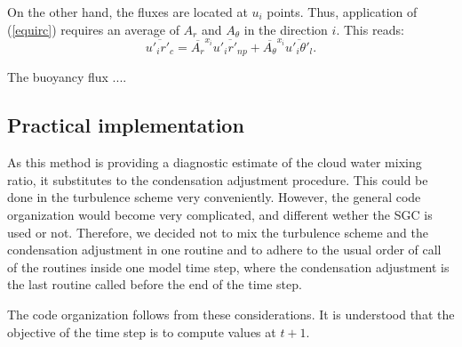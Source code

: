 On the other hand, the fluxes are located at $u_i$ points. Thus,
application of (\ref{equirc}) requires an average of
$A_{r}$ and $A_{\theta}$ in the direction $i$.
This reads:
\begin{equation}
\overline{{u'_{i}}{r'_{c}}} = {\overline{A_{r}}}^{x_{i}} \overline{{u'_{i}}{r'_{np}}} +
{\overline{A_{\theta}}}^{x_{i}} \overline{{u'_{i}}{{\theta}'_{l}}}.
\end{equation}

The buoyancy flux ....


\subsection{Practical implementation}


As this method is providing a diagnostic estimate of
the cloud water mixing ratio,
it substitutes to the condensation adjustment procedure.  This could be done in
the turbulence scheme very conveniently.  However, the general code organization
would become very complicated, and different wether the SGC is used or not.
Therefore, we decided not to mix the turbulence scheme and the condensation
adjustment in one routine and to adhere to the usual order
of call of the routines inside one model time step,
where the condensation adjustment
is the last routine called before the end of the time step.

The code organization follows from these considerations. It is understood
that the objective of the time step is to compute values at $t+1$.

